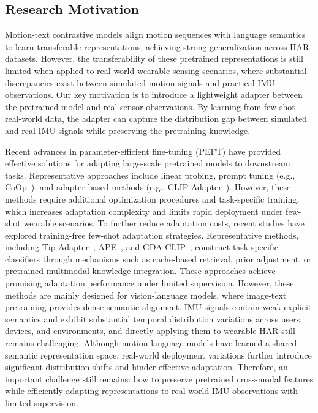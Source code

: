 \documentclass[journal]{IEEEtran}
\begin{document}
\subsection{Research Motivation}

Motion-text contrastive models align motion sequences with language semantics to learn transferable representations, achieving strong generalization across HAR datasets. However, the transferability of these pretrained representations is still limited when applied to real-world wearable sensing scenarios, where substantial discrepancies exist between simulated motion signals and practical IMU observations. Our key motivation is to introduce a lightweight adapter between the pretrained model and real sensor observations. By learning from few-shot real-world data, the adapter can capture the distribution gap between simulated and real IMU signals while preserving the pretraining knowledge.

Recent advances in parameter-efficient fine-tuning (PEFT) have provided effective solutions for adapting large-scale pretrained models to downstream tasks. Representative approaches include linear probing, prompt tuning (e.g., CoOp~\cite{coop}), and adapter-based methods (e.g., CLIP-Adapter~\cite{clipadapter}). However, these methods require additional optimization procedures and task-specific training, which increases adaptation complexity and limits rapid deployment under few-shot wearable scenarios. To further reduce adaptation costs, recent studies have explored training-free few-shot adaptation strategies. Representative methods, including Tip-Adapter~\cite{tipadapter}, APE~\cite{ape}, and GDA-CLIP~\cite{gdaclip}, construct task-specific classifiers through mechanisms such as cache-based retrieval, prior adjustment, or pretrained multimodal knowledge integration. These approaches achieve promising adaptation performance under limited supervision. However, these methods are mainly designed for vision-language models, where image-text pretraining provides dense semantic alignment. IMU signals contain weak explicit semantics and exhibit substantial temporal distribution variations across users, devices, and environments, and directly applying them to wearable HAR still remains challenging. Although motion-language models have learned a shared semantic representation space, real-world deployment variations further introduce significant distribution shifts and hinder effective adaptation. Therefore, an important challenge still remains: how to preserve pretrained cross-modal features while efficiently adapting representations to real-world IMU observations with limited supervision.
\end{document}

